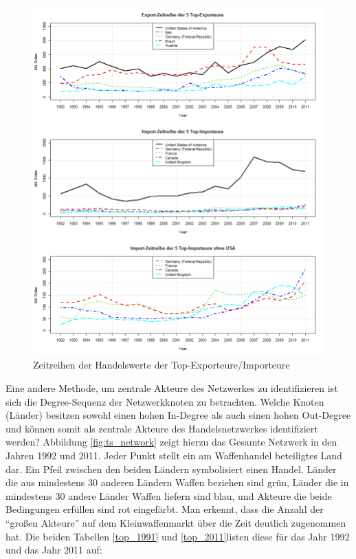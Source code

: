 \documentclass[a4paper,ngerman,oneside,titlepage,bibliography=totoc,11pt]{scrreprt}
\begin{document}
\begin{figure}[ht]
	\centering
		\includegraphics[width=1.00\textwidth]{Grafiken/ts_tops.png}
	\caption{Zeitreihen der Handelswerte der Top-Exporteure/Importeure}
	\label{fig:ts_tops}
\end{figure}
Eine andere Methode, um zentrale Akteure des Netzwerkes zu identifizieren ist sich die Degree-Sequenz der Netzwerkknoten zu betrachten. Welche Knoten (Länder) besitzen sowohl einen hohen In-Degree als auch einen hohen Out-Degree und können somit als zentrale Akteure des Handelsnetzwerkes identifiziert werden?
Abbildung \ref{fig:ts_network} zeigt hierzu das Gesamte Netzwerk in den Jahren 1992 und 2011. Jeder Punkt stellt ein am Waffenhandel beteiligtes Land dar. Ein Pfeil zwischen den beiden Ländern symbolisiert einen Handel. Länder die aus mindestens 30 anderen Ländern Waffen beziehen sind grün, Länder die in mindestens 30 andere Länder Waffen liefern sind blau, und Akteure die beide Bedingungen erfüllen sind rot eingefärbt. Man erkennt, dass die Anzahl der "`großen Akteure"' auf dem Kleinwaffenmarkt über die Zeit deutlich zugenommen hat. Die beiden Tabellen \ref{top_1991} und \ref{top_2011}listen diese für das Jahr 1992 und das Jahr 2011 auf:
\end{document}
